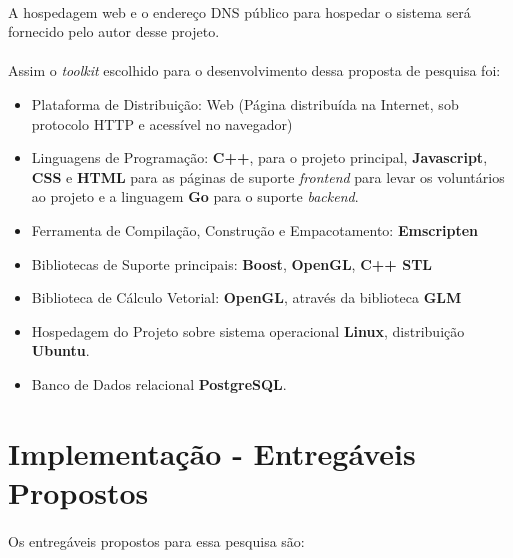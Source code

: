 \documentclass{article}
\begin{document}
	\paragraph{}
	A hospedagem web e o endereço DNS público para hospedar o sistema será fornecido pelo autor desse projeto.
	
	\paragraph{}
	Assim o \textit{toolkit} escolhido para o desenvolvimento dessa proposta de pesquisa foi:
	
	\begin{itemize}
			\item Plataforma de Distribuição: Web (Página distribuída na Internet, sob protocolo HTTP e acessível no navegador)
			\item Linguagens de Programação: \textbf{C++}, para o projeto principal, \textbf{Javascript}, \textbf{CSS} e 	\textbf{HTML} para as páginas de suporte \textit{frontend} para levar os voluntários ao projeto e a linguagem \textbf{Go} para o suporte \textit{backend}.
			\item Ferramenta de Compilação, Construção e Empacotamento: \textbf{Emscripten}
			\item Bibliotecas de Suporte principais: \textbf{Boost}, \textbf{OpenGL}, \textbf{C++ STL}
			\item Biblioteca de Cálculo Vetorial: \textbf{OpenGL}, através da biblioteca \textbf{GLM}		
			\item Hospedagem do Projeto sobre sistema operacional \textbf{Linux}, distribuição \textbf{Ubuntu}.	
			\item Banco de Dados relacional \textbf{PostgreSQL}.
	\end{itemize}
	
	\section{Implementação - Entregáveis Propostos} \label{ie}
	\paragraph{}
	Os entregáveis propostos para essa pesquisa são:
	
\end{document}
